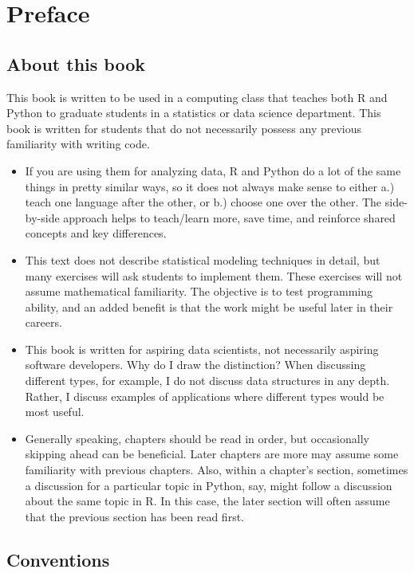 \documentclass[
  12pt,
  krantz2]{krantz}
\begin{document}
\hypertarget{preface}{%
\chapter*{Preface}\label{preface}}


\hypertarget{about-this-book}{%
\section*{About this book}\label{about-this-book}}


This book is written to be used in a computing class that teaches both R and Python to graduate students in a statistics or data science department. This book is written for students that do not necessarily possess any previous familiarity with writing code.

\begin{itemize}
\item
  If you are using them for analyzing data, R and Python do a lot of the same things in pretty similar ways, so it does not always make sense to either a.) teach one language after the other, or b.) choose one over the other. The side-by-side approach helps to teach/learn more, save time, and reinforce shared concepts and key differences.
\item
  This text does not describe statistical modeling techniques in detail, but many exercises will ask students to implement them. These exercises will not assume mathematical familiarity. The objective is to test programming ability, and an added benefit is that the work might be useful later in their careers.
\item
  This book is written for aspiring data scientists, not necessarily aspiring software developers. Why do I draw the distinction? When discussing different types, for example, I do not discuss data structures in any depth. Rather, I discuss examples of applications where different types would be most useful.
\item
  Generally speaking, chapters should be read in order, but occasionally skipping ahead can be beneficial. Later chapters are more may assume some familiarity with previous chapters. Also, within a chapter's section, sometimes a discussion for a particular topic in Python, say, might follow a discussion about the same topic in R. In this case, the later section will often assume that the previous section has been read first.
\end{itemize}

\hypertarget{conventions}{%
\section*{Conventions}\label{conventions}}
\end{document}
